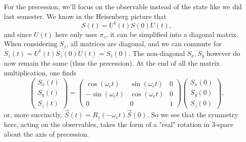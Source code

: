 \documentclass[fontsize=12pt]{scrartcl}
\begin{document}
For the precession, we'll focus on the observable instead of the state like we did last semester. We know in the Heisenberg picture that $$S(t)=U^\dagger(t)S(0)U(t),$$ and since $U(t)$ here only uses $\sigma_z$, it can be simplified into a diagonal matrix. When considering $S_z$, all matrices are diagonal, and we can commute for $S_z(t)=U^\dagger(t)S_z(0)U(t)=S_z(0)$. The non-diagonal $S_x, S_y$ however do now remain the same (thus the precession). At the end of all the matrix multiplication, one finds $$\left(\begin{matrix}
S_x(t)\\S_y(t)\\S_z(t)
\end{matrix}\right) = \left(\begin{matrix}
\cos(\omega_c t) & \sin(\omega_c t) & 0 \\
-\sin(\omega_c t) & \cos(\omega_c t) & 0\\
0&0&1
\end{matrix}\right)\left(\begin{matrix}
S_x(0)\\S_y(0)\\S_z(0)
\end{matrix}\right),$$ or, more succinctly, $\vec{S}(t)=R_z(-\omega_c t)\vec{S}(0)$. So we see that the symmetry here, acting on the observables, takes the form of a "real" rotation in 3-space about the axis of precession.
\end{document}
